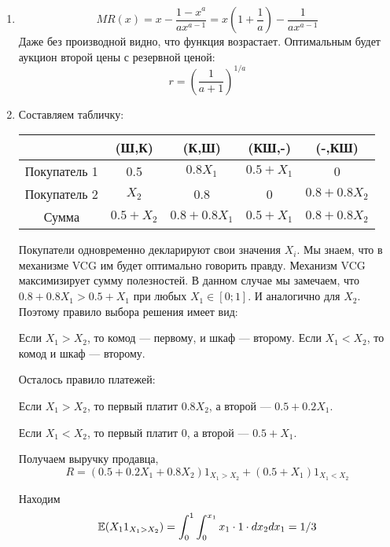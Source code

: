 \begin{enumerate}

\item
\begin{equation}
MR(x)=x-\frac{1-x^{a}}{ax^{a-1}}=x\left(1+\frac{1}{a}\right)-\frac{1}{ax^{a-1}}
\end{equation}
Даже без производной видно, что функция возрастает. Оптимальным будет аукцион второй цены с резервной ценой: 
\begin{equation}
r=\left(\frac{1}{a+1}\right)^{1/a}
\end{equation}

\item Составляем табличку:

\begin{tabular}{c|cccc}
& (Ш,К) & (К,Ш) & (КШ,-) & (-,КШ) \\
\hline
Покупатель 1 & 0.5 & $ 0.8X_{1} $ & $ 0.5+X_{1} $ & 0 \\
Покупатель 2 & $ X_{2} $ & 0.8 & 0 & $ 0.8+0.8X_{2} $ \\
Сумма & $ 0.5+X_{2} $& $ 0.8+0.8X_{1} $ & $ 0.5+X_{1} $ & $ 0.8+0.8X_{2} $ \\
\end{tabular}

Покупатели одновременно декларируют свои значения $ X_{i} $. Мы знаем, что в механизме VCG им будет оптимально говорить правду. Механизм VCG максимизирует сумму полезностей. В данном случае мы замечаем, что $ 0.8+0.8X_{1}>0.5+X_{1} $ при любых $ X_{1} \in [0;1]$. И аналогично для $ X_{2} $. Поэтому правило выбора решения имеет вид:

Если $ X_{1}>X_{2} $, то комод — первому, и шкаф — второму. Если $ X_{1}<X_{2} $, то комод и шкаф — второму.

Осталось правило платежей:

Если $ X_{1}>X_{2} $, то первый платит $ 0.8X_{2} $, а второй — $ 0.5+0.2X_{1} $.

Если $ X_{1}<X_{2} $, то первый платит 0, а второй — $ 0.5+X_{1} $.

Получаем выручку продавца,
\begin{equation}
R=(0.5+0.2X_{1}+0.8X_{2})1_{X_{1}>X_{2}}+(0.5+X_{1})1_{X_{1}<X_{2}}
\end{equation}

Находим
\begin{equation}
\operatorname{\mathbb{E}}(X_{1}1_{X_{1}>X_{2}})=\int_{0}^{1}\int_{0}^{x_{1}}x_{1} \cdot 1 \cdot dx_{2}dx_{1}=1/3
\end{equation}


\end{enumerate}
